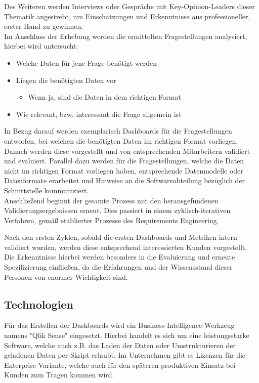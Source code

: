 \documentclass[12pt]{article}
\begin{document}
Des Weiteren werden Interviews oder Gespräche mit Key-Opinion-Leaders dieser
Thematik angestrebt, um Einschätzungen und Erkenntnisse aus professioneller,
erster Hand zu gewinnen. \\
Im Anschluss der Erhebung werden die ermittelten Fragestellungen analysiert,
hierbei wird untersucht:
\begin{itemize}
      \item Welche Daten für jene Frage benötigt werden
      \item Liegen die benötigten Daten vor
      \begin{itemize}
        \item Wenn ja, sind die Daten in dem richtigen Format
      \end{itemize}
      \item Wie relevant, bzw. interessant die Frage allgemein ist
\end{itemize}
In Bezug darauf werden exemplarisch Dashboards für die Fragestellungen
entworfen, bei welchen die benötigten Daten im richtigen Format vorliegen.
Danach werden diese vorgestellt und von entsprechenden Mitarbeitern validiert
und evaluiert. Parallel dazu werden für die Fragestellungen, welche die Daten
nicht im richtigen Format vorliegen haben, entsprechende Datenmodelle oder
Datenformate erarbeitet und Hinweise an die Softwareabteilung bezüglich der
Schnittstelle kommuniziert. \\
Anschließend beginnt der gesamte Prozess mit den herausgefundenen
Validierungsergebnissen erneut. Dies passiert in einem zyklisch-iterativen
Verfahren, gemäß etablierter Prozesse des Requirements Engineering.
\cite{Pohl.2010}

Nach den ersten Zyklen, sobald die ersten Dashboards und Metriken intern
validiert wurden, werden diese entsprechend interessierten Kunden vorgestellt.
Die Erkenntnisse hierbei werden besonders in die Evaluierung und erneute
Spezifizierung einfließen, da die Erfahrungen und der Wissensstand dieser
Personen von enormer Wichtigkeit sind.

\subsection{Technologien}\label{tech}
Für das Erstellen der Dashboards wird ein Business-Intelligence-Werkzeug namens
"Qlik Sense" eingesetzt. Hierbei handelt es sich um eine leistungs\-starke
Software, welche auch z.B. das Laden der Daten oder Umstrukturieren der
geladenen Daten per Skript erlaubt. Im Unternehmen gibt es Lizenzen für die
Enterprise Variante, welche auch für den späteren produktiven Einsatz bei Kunden
zum Tragen kommen wird.
\end{document}
